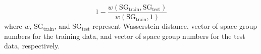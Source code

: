 \begin{equation} \label{eq:validity}
	1-\frac{w\left(\text{SG}_{\text{train}},\text{SG}_{\text{test}}\right)}{w\left(\text{SG}_{\text{train}},1\right)}
\end{equation}
where $\mathit{w}$, $\text{SG}_{\text{train}}$, and $\text{SG}_{\text{test}}$ represent Wasserstein distance, vector of space group numbers for the training data, and vector of space group numbers for the test data, respectively.
